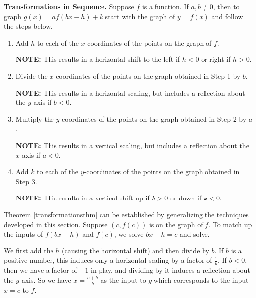 \colorbox{ResultColor}{\bbm


\begin{thm} \label{transformationsthm}\textbf{Transformations in Sequence.}  Suppose $f$ is a function.  If $a, b \neq 0$, then to graph $g(x) = a f(bx-h)+k$ start with the graph of $y=f(x)$ and follow the steps below.

\begin{enumerate}

\item  Add $h$ to each of the $x$-coordinates of the points on the graph of $f$.  

\textbf{NOTE:} This results in a horizontal shift to the left if $h < 0$ or right if $h > 0$.

\item  Divide the $x$-coordinates of the points on the graph obtained in Step 1 by $b$.  

\textbf{NOTE:} This results in a horizontal scaling, but includes a reflection about the $y$-axis if $b < 0$.

\item  Multiply the $y$-coordinates of the points on the graph obtained in Step 2 by $a$.   

\textbf{NOTE:} This results in a vertical scaling, but  includes a reflection about the $x$-axis if $a < 0$.

\item  Add $k$ to each of the $y$-coordinates of the points on the graph obtained in Step 3.  

\textbf{NOTE:} This results in a vertical shift up if $k > 0$ or down if $k < 0$.

\end{enumerate}

\end{thm}

\ebm}

\bigskip

Theorem \ref{transformationsthm} can be established by generalizing the techniques developed in this section.  Suppose $(c,f(c))$ is on the graph of $f$. To match up the inputs of $f(bx-h)$ and $f(c)$, we solve $bx-h = c$ and solve.  

\smallskip

We first add the $h$ (causing the horizontal shift) and then divide by $b$.  If $b$ is a positive number, this induces only a horizontal scaling by a factor of $\frac{1}{b}$.  If  $b<0$, then we have a factor of $-1$ in play, and dividing by it induces a reflection about the $y$-axis.  So we have $x = \frac{c+h}{b}$ as the input to $g$ which corresponds to the input $x=c$ to $f$.  

